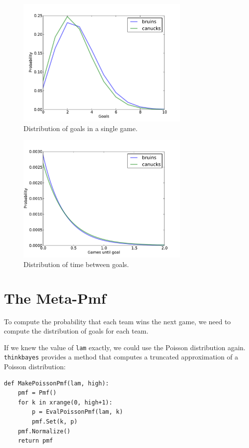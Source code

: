 \documentclass[12pt]{book}
\begin{document}
\begin{figure}
\centerline{\includegraphics[height=2.5in]{figs/hockey2.pdf}}
\caption{Distribution of goals in a single game.}
\label{fig.hockey2}
\end{figure}

\begin{figure}
\centerline{\includegraphics[height=2.5in]{figs/hockey3.pdf}}
\caption{Distribution of time between goals.}
\label{fig.hockey3}
\end{figure}


\section{The Meta-Pmf}
\label{meta-pmf}

To compute the probability that each team wins the next game,
we need to compute the distribution of goals for each team.

If we knew the value of {\tt lam} exactly, we could use the
Poisson distribution again.  \verb"thinkbayes" provides a
method that computes a truncated approximation of a Poisson
distribution:

\begin{verbatim}
def MakePoissonPmf(lam, high):
    pmf = Pmf()
    for k in xrange(0, high+1):
        p = EvalPoissonPmf(lam, k)
        pmf.Set(k, p)
    pmf.Normalize()
    return pmf
\end{verbatim}  
\end{document}

